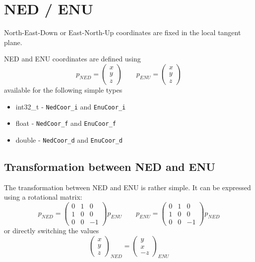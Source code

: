 \section{NED / ENU}
North-East-Down or East-North-Up coordinates are fixed in the local tangent plane. 

NED and ENU coordinates are defined using
\begin{equation}
p_{NED} = \begin{pmatrix} x \\ y \\ z \end{pmatrix} \qquad
p_{ENU} = \begin{pmatrix} x \\ y \\ z \end{pmatrix}
\end{equation}
available for the following simple types
\begin{itemize}
\item int32\_t - \texttt{NedCoor\_i} and \texttt{EnuCoor\_i}
\item float - \texttt{NedCoor\_f} and \texttt{EnuCoor\_f}
\item double - \texttt{NedCoor\_d} and \texttt{EnuCoor\_d}
\end{itemize}

\subsection{Transformation between NED and ENU}
The transformation between NED and ENU is rather simple. It can be expressed using a rotational matrix:
\begin{equation}
p_{NED} = \begin{pmatrix}
0 & 1 &  0 \\
1 & 0 &  0 \\
0 & 0 & -1
\end{pmatrix}
p_{ENU} \qquad p_{ENU} = \begin{pmatrix}
0 & 1 &  0 \\
1 & 0 &  0 \\
0 & 0 & -1
\end{pmatrix} p_{NED}
\end{equation}
or directly switching the values
\begin{equation}
\begin{pmatrix}x \\ y \\  z \end{pmatrix}_{NED} = 
\begin{pmatrix}y \\ x \\ -z \end{pmatrix}_{ENU}
\end{equation}



